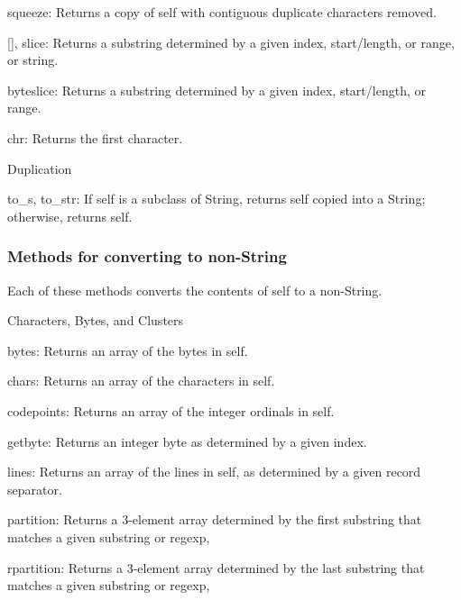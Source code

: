 squeeze: Returns a copy of self with contiguous duplicate characters removed.

[], slice: Returns a substring determined by a given index, start/length, or range, or string.

byteslice: Returns a substring determined by a given index, start/length, or range.

chr: Returns the first character.

Duplication

to\_s, to\_str: If self is a subclass of String, returns self copied into a String; otherwise, returns self.


\subsubsection{Methods for converting to non-String}
Each of these methods converts the contents of self to a non-String.

Characters, Bytes, and Clusters

bytes: Returns an array of the bytes in self.

chars: Returns an array of the characters in self.

codepoints: Returns an array of the integer ordinals in self.

getbyte: Returns an integer byte as determined by a given index.


lines: Returns an array of the lines in self, as determined by a given record separator.

partition: Returns a 3-element array determined by the first substring that matches a given substring or regexp,

rpartition: Returns a 3-element array determined by the last substring that matches a given substring or regexp,

